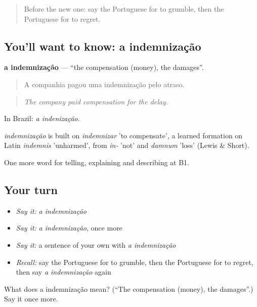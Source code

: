 \label{lesson:PT-C434-indemnizacao}



\begin{quote}
Before the new one: say the Portuguese for to grumble, then the Portuguese for to regret.
\end{quote}

\subsection*{You'll want to know: a indemnização}
\textbf{a indemnização} — \textquotedblleft{}the compensation (money), the damages\textquotedblright{}.

\begin{quote}
A companhia pagou uma indemnização pelo atraso.
\end{quote}

\begin{quote}
\emph{The company paid compensation for the delay.}
\end{quote}

In Brazil: \emph{a indenização}.

\begin{cousinweb}
\emph{indemnização} is built on \emph{indemnizar} 'to compensate', a learned formation on Latin \emph{indemnis} 'unharmed', from \emph{in-} 'not' and \emph{damnum} 'loss' (Lewis \& Short).
\end{cousinweb}

\begin{grammarlens}[title={What you've built}]
One more word for telling, explaining and describing at B1.
\end{grammarlens}

\subsection*{Your turn}
\begin{itemize}
\raggedright
  \item \emph{Say it:} \emph{a indemnização}
  \item \emph{Say it:} \emph{a indemnização}, once more
  \item \emph{Say it:} a sentence of your own with \emph{a indemnização}
  \item \emph{Recall:} say the Portuguese for to grumble, then the Portuguese for to regret, then say \emph{a indemnização} again
\end{itemize}

\begin{tcolorbox}[breakable,colback=teal!4,colframe=teal!35!black,title={Before you move on}]
What does a indemnização mean? (\textquotedblleft{}The compensation (money), the damages\textquotedblright{}.) Say it once more.
\end{tcolorbox}
